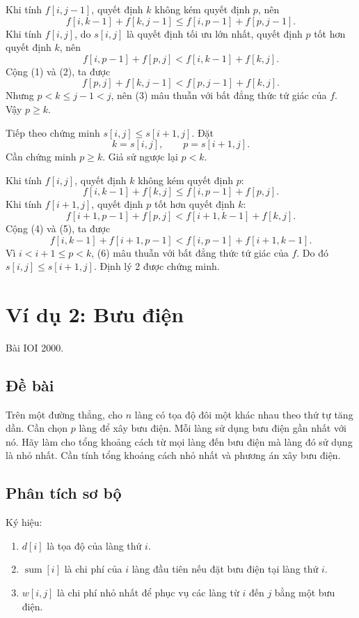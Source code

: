 \documentclass[11pt]{article}
\begin{document}
Khi tính $f[i,j-1]$, quyết định $k$ không kém quyết định $p$, nên
\[
  f[i,k-1]+f[k,j-1]\le f[i,p-1]+f[p,j-1]. \tag{1}
\]
Khi tính $f[i,j]$, do $s[i,j]$ là quyết định tối ưu lớn nhất, quyết định $p$
tốt hơn quyết định $k$, nên
\[
  f[i,p-1]+f[p,j]<f[i,k-1]+f[k,j]. \tag{2}
\]
Cộng (1) và (2), ta được
\[
  f[p,j]+f[k,j-1]<f[p,j-1]+f[k,j]. \tag{3}
\]
Nhưng $p<k\le j-1<j$, nên (3) mâu thuẫn với bất đẳng thức tứ giác của $f$.
Vậy $p\ge k$.

Tiếp theo chứng minh $s[i,j]\le s[i+1,j]$. Đặt
\[
  k=s[i,j],\qquad p=s[i+1,j].
\]
Cần chứng minh $p\ge k$. Giả sử ngược lại $p<k$.

Khi tính $f[i,j]$, quyết định $k$ không kém quyết định $p$:
\[
  f[i,k-1]+f[k,j]\le f[i,p-1]+f[p,j]. \tag{4}
\]
Khi tính $f[i+1,j]$, quyết định $p$ tốt hơn quyết định $k$:
\[
  f[i+1,p-1]+f[p,j]<f[i+1,k-1]+f[k,j]. \tag{5}
\]
Cộng (4) và (5), ta được
\[
  f[i,k-1]+f[i+1,p-1]
  < f[i,p-1]+f[i+1,k-1]. \tag{6}
\]
Vì $i<i+1\le p<k$, (6) mâu thuẫn với bất đẳng thức tứ giác của $f$. Do đó
$s[i,j]\le s[i+1,j]$. Định lý 2 được chứng minh.

\section{Ví dụ 2: Bưu điện}

Bài IOI 2000.

\subsection*{Đề bài}

Trên một đường thẳng, cho $n$ làng có tọa độ đôi một khác nhau theo thứ tự
tăng dần. Cần chọn $p$ làng để xây bưu điện. Mỗi làng sử dụng bưu điện gần
nhất với nó. Hãy làm cho tổng khoảng cách từ mọi làng đến bưu điện mà làng đó
sử dụng là nhỏ nhất. Cần tính tổng khoảng cách nhỏ nhất và phương án xây bưu
điện.

\subsection*{Phân tích sơ bộ}

Ký hiệu:
\begin{enumerate}
  \item $d[i]$ là tọa độ của làng thứ $i$.
  \item $\operatorname{sum}[i]$ là chi phí của $i$ làng đầu tiên nếu đặt bưu
  điện tại làng thứ $i$.
  \item $w[i,j]$ là chi phí nhỏ nhất để phục vụ các làng từ $i$ đến $j$ bằng
  một bưu điện.
\end{enumerate}
\end{document}

